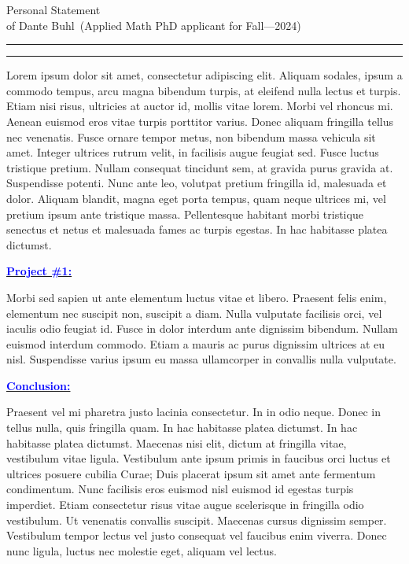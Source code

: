 \documentclass{article}
\newcommand{\soptitle}{Personal Statement}
\newcommand{\yourname}{Dante Buhl}
\newcommand{\statement}[1]{\par\medskip
  \underline{\textcolor{blue}{\textbf{#1:}}}\space
}
\begin{document}
\begin{center}\LARGE\soptitle\\
\large of \yourname\ (Applied Math PhD applicant for Fall---2024)
\end{center}

\hrule
\vspace{1pt}
\hrule height 1pt

\bigskip

Lorem ipsum dolor sit amet, consectetur adipiscing elit. Aliquam
sodales, ipsum a commodo tempus, arcu magna bibendum turpis, at
eleifend nulla lectus et turpis. Etiam nisi risus, ultricies at auctor
id, mollis vitae lorem. Morbi vel rhoncus mi. Aenean euismod eros
vitae turpis porttitor varius. Donec aliquam fringilla tellus nec
venenatis. Fusce ornare tempor metus, non bibendum massa vehicula sit
amet. Integer ultrices rutrum velit, in facilisis augue feugiat sed.
Fusce luctus tristique pretium. Nullam consequat tincidunt sem, at
gravida purus gravida at. Suspendisse potenti. Nunc ante leo, volutpat
pretium fringilla id, malesuada et dolor. Aliquam blandit, magna eget
porta tempus, quam neque ultrices mi, vel pretium ipsum ante tristique
massa. Pellentesque habitant morbi tristique senectus et netus et
malesuada fames ac turpis egestas. In hac habitasse platea dictumst.

\statement{Project \#1}
Morbi sed sapien ut ante elementum luctus vitae et libero. Praesent
felis enim, elementum nec suscipit non, suscipit a diam. Nulla
vulputate facilisis orci, vel iaculis odio feugiat id. Fusce in dolor
interdum ante dignissim bibendum. Nullam euismod interdum commodo.
Etiam a mauris ac purus dignissim ultrices at eu nisl. Suspendisse
varius ipsum eu massa ullamcorper in convallis nulla vulputate.


\statement{Conclusion}
Praesent vel mi pharetra justo lacinia consectetur. In in odio neque.
Donec in tellus nulla, quis fringilla quam. In hac habitasse platea
dictumst. In hac habitasse platea dictumst. Maecenas nisi elit, dictum
at fringilla vitae, vestibulum vitae ligula. Vestibulum ante ipsum
primis in faucibus orci luctus et ultrices posuere cubilia Curae; Duis
placerat ipsum sit amet ante fermentum condimentum. Nunc facilisis
eros euismod nisl euismod id egestas turpis imperdiet. Etiam
consectetur risus vitae augue scelerisque in fringilla odio
vestibulum. Ut venenatis convallis suscipit. Maecenas cursus dignissim
semper. Vestibulum tempor lectus vel justo consequat vel faucibus enim
viverra. Donec nunc ligula, luctus nec molestie eget, aliquam vel
lectus.
\end{document}
